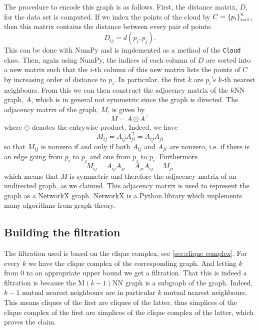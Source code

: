 \documentclass[../main.tex]{subfiles}
\begin{document}
The procedure to encode this graph is as follows. First, the distance matrix, \( D \), for
the data set is computed. If we index the points of the cloud by \( C = \left\{ p_i \right\}_{i =
1}^n \), then this matrix contains the distance between every pair of points:
\begin{equation*}
	D_{ij} = d(p_i, p_j). 
\end{equation*}
This can be done with \textsf{NumPy} and is implemented as a method of the \texttt{Cloud}
class. Then, again using \textsf{NumPy}, the indices of each
column of \( D \) are sorted into a new matrix such that the \( i \)-th column of this new
matrix lists the points of \( C \) by increasing order of distance to \( p_i \). In
particular, the first \( k \) are \( p_i \)'s \( k \)-th nearest neighbours. From this we
can then construct the adjacency matrix of the \( k \)NN graph, \( A \), which is in
general not symmetric since the graph is directed. The adjacency matrix of the \MKNN
graph, \( M \), is given by
\begin{equation*}
	M = A \odot A^\top
\end{equation*}
where \( \odot \) denotes the entrywise product. Indeed, we have
\begin{equation*}
	M_{ij} = A_{ij}A^\top_{ji} = A_{ij}A_{ji}
\end{equation*}
so that \( M_{ij} \) is nonzero if and only if both \( A_{ij} \) and \( A_{ji} \) are
nonzero, i.e. if there is an edge going from \( p_i \) to \( p_j \) and one from \( p_j	\) to \( p_i \). Furthermore 
\begin{equation*}
	M_{ij} = A_{ij}A_{ji} = A_{ji}A_{ij} = M_{ji}
\end{equation*}
which means that \( M \) is symmetric and therefore the adjacency matrix of an undirected
graph, as we claimed. This adjacency matrix is used to represent the \MKNN graph as a
\textsf{NetworkX} graph. \textsf{NetworkX} is a Python library which implements many
algorithms from graph theory. 

\subsection{Building the filtration}
The filtration used is based on the clique complex, see \cref{sec:clique complex}. For
every \( k \) we have the clique complex of the corresponding \MKNN graph. And letting
\( k \) from 0 to an appropriate upper bound we get a filtration. That this is indeed a
filtration is because the M\( (k-1) \)NN graph is a subgraph of the \MKNN graph. Indeed,
\( k-1 \) mutual nearest neighbours are in particular \( k \) mutual nearest neighbours.
This means cliques of the first are cliques of the latter, thus simplices of the clique
complex of the first are simplices of the clique complex of the latter, which proves the
claim. 
\end{document}
